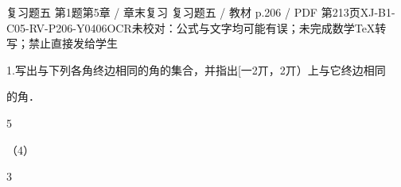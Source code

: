 \begin{bankitem}{复习题五 第1题}{第5章 / 章末复习 复习题五 / 教材 p.206 / PDF 第213页}{XJ-B1-C05-RV-P206-Y0406}{OCR未校对：公式与文字均可能有误；未完成数学TeX转写；禁止直接发给学生}
\begin{ocrdraft}
\par
1.写出与下列各角终边相同的角的集合，并指出[一2丌，2丌）上与它终边相同
\par
的角．
\par
5
\par
（4）
\par
3
\end{ocrdraft}
\end{bankitem}

